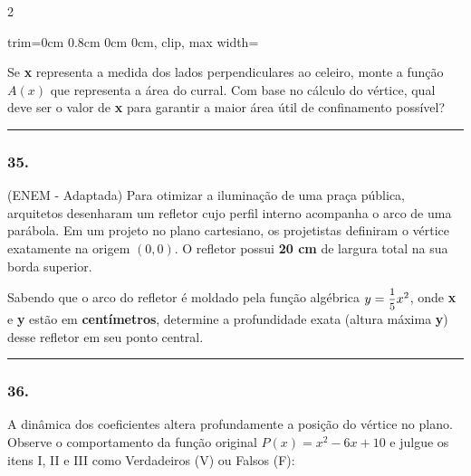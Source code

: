 \documentclass[twoside, 10pt, a4paper]{article}
\newlength{\espacoPreQuestao}
\newlength{\espacoQuestao}
\newlength{\larguraTikz}
\begin{document}
\begin{multicols*}{2}
\begin{center}
\begin{adjustbox}{trim=0cm 0.8cm 0cm 0cm, clip, max width=\larguraTikz}
\end{adjustbox}
\end{center}

Se \textbf{x} representa a medida dos lados perpendiculares ao celeiro, monte a função $A(x)$ que representa a área do curral. Com base no cálculo do vértice, qual deve ser o valor de \textbf{x} para garantir a maior área útil de confinamento possível?
\par\vspace{\espacoQuestao}

\noindent\textcolor{CorLinha}{\rule{\linewidth}{0.5pt}} 
\par\vspace{\espacoPreQuestao}
\subsubsection*{35.} (ENEM - Adaptada) Para otimizar a iluminação de uma praça pública, arquitetos desenharam um refletor cujo perfil interno acompanha o arco de uma parábola. Em um projeto no plano cartesiano, os projetistas definiram o vértice exatamente na origem $(0,0)$. O refletor possui \textbf{20 cm} de largura total na sua borda superior.

Sabendo que o arco do refletor é moldado pela função algébrica $y = \mfrac{1}{5}x^2$, onde \textbf{x} e \textbf{y} estão em \textbf{centímetros}, determine a profundidade exata (altura máxima \textbf{y}) desse refletor em seu ponto central.
\par\vspace{\espacoQuestao}

\noindent\textcolor{CorLinha}{\rule{\linewidth}{0.5pt}} 
\par\vspace{\espacoPreQuestao}
\subsubsection*{36.} A dinâmica dos coeficientes altera profundamente a posição do vértice no plano. Observe o comportamento da função original $P(x) = x^2 - 6x + 10$ e julgue os itens I, II e III como Verdadeiros (V) ou Falsos (F):


\end{multicols*}
\end{document}
